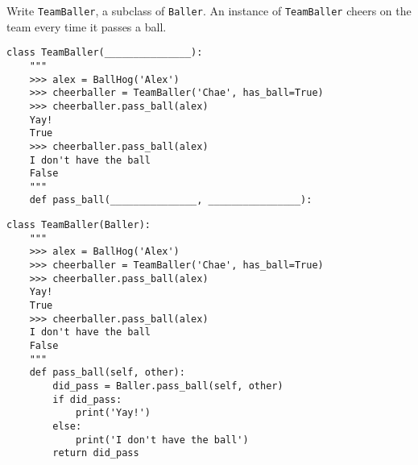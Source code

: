 \begin{blocksection}
Write \lstinline$TeamBaller$, a subclass of \lstinline$Baller$. An instance of \lstinline$TeamBaller$ cheers on the team every time it passes a ball.

\ifprintanswers\else
\begin{lstlisting}
class TeamBaller(_______________):
    """
    >>> alex = BallHog('Alex')
    >>> cheerballer = TeamBaller('Chae', has_ball=True)
    >>> cheerballer.pass_ball(alex)
    Yay!
    True
    >>> cheerballer.pass_ball(alex)
    I don't have the ball
    False
    """
    def pass_ball(_______________, ________________):
\end{lstlisting}
\fi

\begin{solution}[1in]
\begin{lstlisting}
class TeamBaller(Baller):
    """
    >>> alex = BallHog('Alex')
    >>> cheerballer = TeamBaller('Chae', has_ball=True)
    >>> cheerballer.pass_ball(alex)
    Yay!
    True
    >>> cheerballer.pass_ball(alex)
    I don't have the ball
    False
    """
    def pass_ball(self, other):
        did_pass = Baller.pass_ball(self, other)
        if did_pass:
            print('Yay!')
        else:
            print('I don't have the ball')
        return did_pass
\end{lstlisting}
\end{solution}
\end{blocksection}
